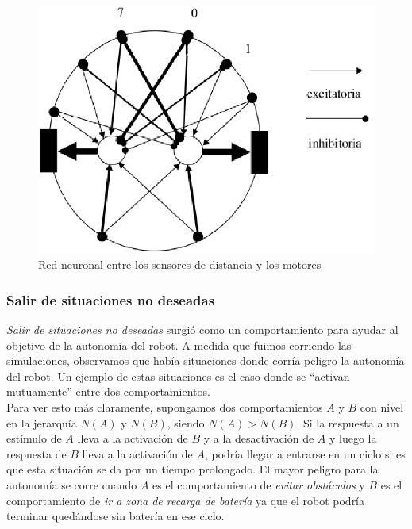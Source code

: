 \begin{figure}[htp]
\begin{center}
\includegraphics[scale=0.4]{comportamientos/red.png}
\caption{Red neuronal entre los sensores de distancia y los motores}
\label{fig:redN}
\end{center}
\end{figure}

\subsubsection{Salir de situaciones no deseadas}
\label{out_of_unwanted_situations}
\emph{Salir de situaciones no deseadas} surgi\'o como un comportamiento
para ayudar al objetivo de la autonom\'ia del robot. A medida que fuimos
corriendo las simulaciones, observamos que hab\'ia situaciones donde corr\'ia
peligro la autonom\'ia del robot. Un ejemplo de estas situaciones es el caso
donde se ``activan mutuamente'' entre dos comportamientos.
\\
Para ver esto m\'as claramente, supongamos dos comportamientos $A$ y $B$ con
nivel en la jerarqu\'ia $N(A)$ y $N(B)$, siendo $N(A) > N(B)$. Si la respuesta
a un est\'imulo de $A$ lleva a la activaci\'on de $B$ y a la desactivaci\'on de $A$
y luego la respuesta de $B$ lleva a la activaci\'on de $A$, podr\'ia llegar a
entrarse en un ciclo si es que esta situaci\'on se da por un tiempo prolongado.
El mayor peligro para la autonom\'ia se corre cuando $A$ es el comportamiento
de \emph{evitar obst\'aculos} y $B$ es el comportamiento de \emph{ir a zona
de recarga de bater\'ia} ya que el robot podr\'ia terminar qued\'andose sin
bater\'ia en ese ciclo.
